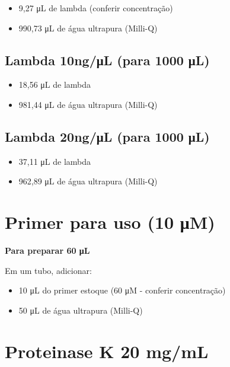 \documentclass[
  letterpaper,
  DIV=11,
  numbers=noendperiod]{scrreprt}
\begin{document}
\begin{itemize}
\item
  9,27 μL de lambda (conferir concentração)
\item
  990,73 μL de água ultrapura (Milli-Q)
\end{itemize}

\hypertarget{lambda-10ngux3bcl-para-1000-ux3bcl}{%
\subsection{Lambda 10ng/μL (para 1000
μL)}\label{lambda-10ngux3bcl-para-1000-ux3bcl}}

\begin{itemize}
\item
  18,56 μL de lambda
\item
  981,44 μL de água ultrapura (Milli-Q)
\end{itemize}

\hypertarget{lambda-20ngux3bcl-para-1000-ux3bcl}{%
\subsection{Lambda 20ng/μL (para 1000
μL)}\label{lambda-20ngux3bcl-para-1000-ux3bcl}}

\begin{itemize}
\item
  37,11 μL de lambda
\item
  962,89 μL de água ultrapura (Milli-Q)
\end{itemize}

\hypertarget{primer-para-uso-10-ux3bcm}{%
\section{Primer para uso (10 μM)}\label{primer-para-uso-10-ux3bcm}}

\textbf{Para preparar 60 μL}

Em um tubo, adicionar:

\begin{itemize}
\item
  10 μL do primer estoque (60 μM - conferir concentração)
\item
  50 μL de água ultrapura (Milli-Q)
\end{itemize}

\hypertarget{proteinase-k-20-mgml}{%
\section{Proteinase K 20 mg/mL}\label{proteinase-k-20-mgml}}
\end{document}
